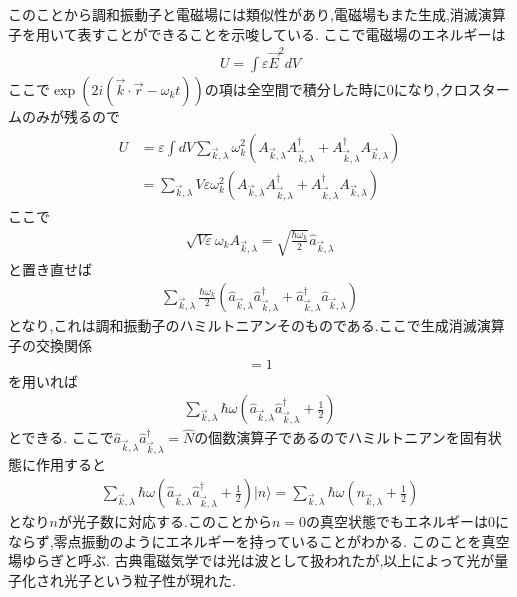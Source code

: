 \documentclass[uplatex,a4j,11pt,dvipdfmx]{jsarticle}
\begin{document}
このことから調和振動子と電磁場には類似性があり,電磁場もまた生成,消滅演算子を用いて表すことができることを示唆している.
ここで電磁場のエネルギーは
\begin{align*}
  U=\int\varepsilon\vec{E}^2dV
\end{align*}
ここで$\exp(2i(\vec{k}\cdot\vec{r}-\omega_kt))$の項は全空間で積分した時に0になり,クロスタームのみが残るので
\begin{align*}
  \begin{split}
    U&=\varepsilon\int dV\sum_{\vec{k},\lambda}\omega_k^2(A_{\vec{k},\lambda}A_{\vec{k},\lambda}^\dagger+A_{\vec{k},\lambda}^\dagger A_{\vec{k},\lambda})\\
    &=\sum_{\vec{k},\lambda}V\varepsilon\omega_k^2(A_{\vec{k},\lambda}A_{\vec{k},\lambda}^\dagger+A_{\vec{k},\lambda}^\dagger A_{\vec{k},\lambda})
  \end{split}
\end{align*}
ここで
\begin{align*}
  \sqrt{V\varepsilon}\omega_kA_{\vec{k},\lambda}=\sqrt{\frac{\hbar\omega_k}{2}}\hat{a}_{\vec{k},\lambda}
\end{align*}
と置き直せば
\begin{align*}
  \sum_{\vec{k},\lambda}\frac{\hbar\omega_k}{2}(\hat{a}_{\vec{k},\lambda}\hat{a}_{\vec{k},\lambda}^\dagger+\hat{a}_{\vec{k},\lambda}^\dagger\hat{a}_{\vec{k},\lambda})
\end{align*}
となり,これは調和振動子のハミルトニアンそのものである.ここで生成消滅演算子の交換関係
\begin{align*}
  [\hat{a}_{\vec{k},\lambda},\hat{a}_{\vec{k},\lambda}^\dagger]=1
\end{align*}
を用いれば
\begin{align*}
  \sum_{\vec{k},\lambda}\hbar\omega\left(\hat{a}_{\vec{k},\lambda}\hat{a}_{\vec{k},\lambda}^\dagger+\frac{1}{2}\right)
\end{align*}
とできる.
ここで$\hat{a}_{\vec{k},\lambda}\hat{a}_{\vec{k},\lambda}^\dagger=\hat{N}$の個数演算子であるのでハミルトニアンを固有状態に作用すると
\begin{align}
  \sum_{\vec{k},\lambda}\hbar\omega\left(\hat{a}_{\vec{k},\lambda}\hat{a}_{\vec{k},\lambda}^\dagger+\frac{1}{2}\right)|n\rangle=\sum_{\vec{k},\lambda}\hbar\omega\left(n_{\vec{k},\lambda}+\frac{1}{2}\right)
\end{align}
となり$n$が光子数に対応する.このことから$n=0$の真空状態でもエネルギーは0にならず,零点振動のようにエネルギーを持っていることがわかる.
このことを真空場ゆらぎと呼ぶ.
古典電磁気学では光は波として扱われたが,以上によって光が量子化され光子という粒子性が現れた.
\end{document}
